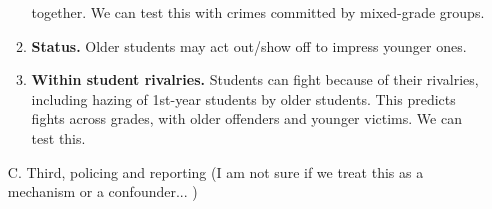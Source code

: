 \begin{enumerate}
\begin{enumerate}
                  together. We can test this with crimes committed by mixed-grade
                  groups.             
            \item \textbf{Status.} Older students may act out/show off to
                  impress younger ones. 
            \item \textbf{Within student rivalries.} Students can fight because of their
                  rivalries, including hazing of 1st-year students by older
                  students. This predicts fights
                 across grades, with older offenders and younger
                  victims. We can test this. 
      \end{enumerate}
            \item[C.] Third, policing and reporting (I am not sure if we treat this as a mechanism or a confounder... )


\end{enumerate}
